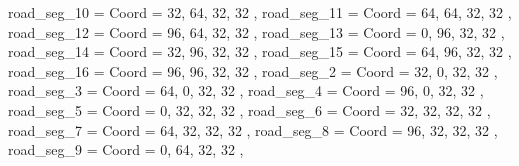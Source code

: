 {	road_seg_10								= { Coord = { 32, 64, 32, 32 } },
	road_seg_11								= { Coord = { 64, 64, 32, 32 } },
	road_seg_12								= { Coord = { 96, 64, 32, 32 } },
	road_seg_13								= { Coord = { 0, 96, 32, 32 } },
	road_seg_14								= { Coord = { 32, 96, 32, 32 } },
	road_seg_15								= { Coord = { 64, 96, 32, 32 } },
	road_seg_16								= { Coord = { 96, 96, 32, 32 } },
	road_seg_2								= { Coord = { 32, 0, 32, 32 } },
	road_seg_3								= { Coord = { 64, 0, 32, 32 } },
	road_seg_4								= { Coord = { 96, 0, 32, 32 } },
	road_seg_5								= { Coord = { 0, 32, 32, 32 } },
	road_seg_6								= { Coord = { 32, 32, 32, 32 } },
	road_seg_7								= { Coord = { 64, 32, 32, 32 } },
	road_seg_8								= { Coord = { 96, 32, 32, 32 } },
	road_seg_9								= { Coord = { 0, 64, 32, 32 } },
}
